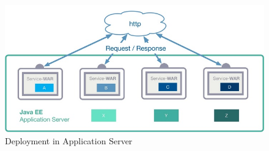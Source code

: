 \begin{figure}[h!]
	\centering
	\includegraphics[width=1.0\linewidth]{images/mp1}
	\caption{Deployment in Application Server \cite{LarsRowekamp.2017d}}
	\label{fig:mp1}
\end{figure}

